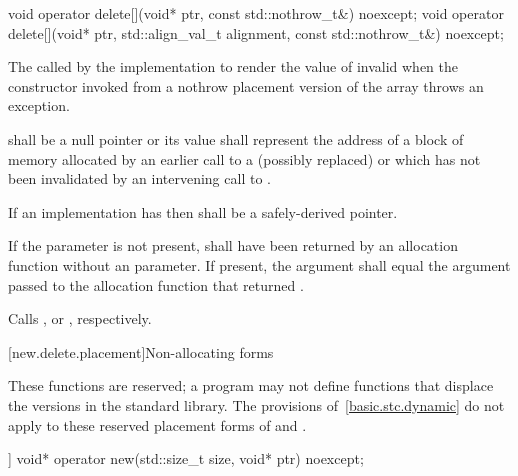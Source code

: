 %
\begin{itemdecl}
void operator delete[](void* ptr, const std::nothrow_t&) noexcept;
void operator delete[](void* ptr, std::align_val_t alignment, const std::nothrow_t&) noexcept;
\end{itemdecl}

\begin{itemdescr}
\pnum
\effects
The
called by the implementation
to render the value of  invalid
when the constructor invoked from a nothrow
placement version of the array  throws an exception.

\pnum
\replaceable
{}

\pnum
\requires
{} shall be a null pointer or
its value shall represent the address of
a block of memory allocated by
an earlier call to a (possibly replaced)
or
which has not been invalidated by an intervening call to
.

\pnum
\requires
If an implementation has 
then  shall be a safely-derived pointer.

\pnum
\requires
If the  parameter is not present,
 shall have been returned by an allocation function
without an  parameter.
If present, the  argument
shall equal the  argument
passed to the allocation function that returned .

\pnum
{}
Calls ,
or ,
respectively.
\end{itemdescr}

[new.delete.placement]{Non-allocating forms}

\pnum
These functions are reserved; a \Cpp{} program may not define functions that displace
the versions in the \Cpp{} standard library.
The provisions of~\ref{basic.stc.dynamic} do not apply to these reserved
placement forms of  and .

%
\begin{itemdecl}
[[nodiscard]] void* operator new(std::size_t size, void* ptr) noexcept;
\end{itemdecl}

